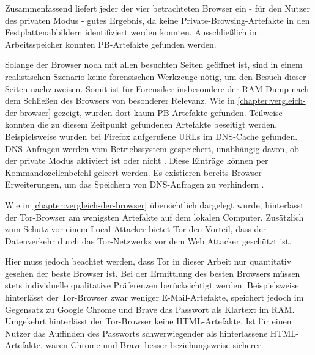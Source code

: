 \begin{comment}
Weiterführende Arbeiten:
> Cross-mode interference \cite{Hedberg.2013}:
	o	the Chrome://memory page displays all the opened tabs in the browser regardless if they are in the usual or private mode -> Nicht mehr aktuell -> Stattdessen: Chrome Task-manager (Ctrl + Esc), Funktioniert auch bei Firefox
> Unser Scope: Process Monitor nach Prozessnamen gefiltert
	- Weiterführend: Nach Pathnamen filtern: "Common Locations"

> Für wen wird Browser entwickelt
> Warum und für wen wird Private Browsing analysiert?
> Ist das Auffinden privater Browsing-Artefakte Schuld von Browser Entwicklern? (Oder Schuld des Betriebssystem, wie in (TODO!) erwähnt)
\end{comment}

Zusammenfassend liefert jeder der vier betrachteten Browser ein - für den Nutzer des privaten Modus - gutes Ergebnis, da keine Private-Browsing-Artefakte in den Festplattenabbildern identifiziert werden konnten. 
Ausschließlich im Arbeitsspeicher konnten PB-Artefakte gefunden werden.

Solange der Browser noch mit allen besuchten Seiten geöffnet ist, sind in einem realistischen Szenario keine forensischen Werkzeuge nötig, um den Besuch dieser Seiten nachzuweisen. Somit ist für Forensiker insbesondere der RAM-Dump nach dem Schließen des Browsers von besonderer Relevanz. 
Wie in \autoref{chapter:vergleich-der-browser} gezeigt, wurden dort kaum PB-Artefakte gefunden.
Teilweise konnten die zu diesem Zeitpunkt gefundenen Artefakte beseitigt werden.
Beispielsweise wurden bei Firefox aufgerufene URLs im DNS-Cache gefunden. DNS-Anfragen werden vom Betriebssystem gespeichert, unabhängig davon, ob der private Modus aktiviert ist oder nicht \cite{Satvat.2014}. Diese Einträge können per Kommandozeilenbefehl geleert werden. Es existieren bereits Browser-Erweiterungen, um das Speichern von DNS-Anfragen zu verhindern \cite{Satvat.2014}.

Wie in \autoref{chapter:vergleich-der-browser} übersichtlich dargelegt wurde, hinterlässt der Tor-Browser am wenigsten Artefakte auf dem lokalen Computer. 
Zusätzlich zum Schutz vor einem Local Attacker bietet Tor den Vorteil, dass der Datenverkehr durch das Tor-Netzwerks vor dem Web Attacker geschützt ist. 

Hier muss jedoch beachtet werden, dass Tor in dieser Arbeit nur quantitativ gesehen der beste Browser ist.
Bei der Ermittlung des besten Browsers müssen stets individuelle qualitative Präferenzen berücksichtigt werden. 
Beispielsweise hinterlässt der Tor-Browser zwar weniger E-Mail-Artefakte, speichert jedoch im Gegensatz zu Google Chrome und Brave das Passwort als Klartext im RAM. Umgekehrt hinterlässt der Tor-Browser keine HTML-Artefakte.
Ist für einen Nutzer das Auffinden des Passworts schwerwiegender als hinterlassene HTML-Artefakte, wären Chrome und Brave \glqq{}besser\grqq{} beziehungsweise \glqq{}sicherer\grqq{}.

